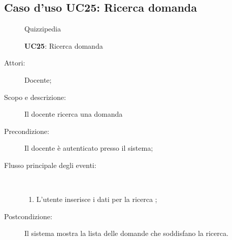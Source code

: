 \subsection{Caso d'uso UC25: Ricerca domanda}
\begin{figure}[H]
	\centering
	\begin{resizedtikzpicture}{\textwidth}
		\begin{umlsystem}[x=0, fill=lightgray!20]{Quizzipedia}
		\end{umlsystem}
	\end{resizedtikzpicture}
	\caption{\textbf{UC25}: Ricerca domanda}
	\label{UC25}
\end{figure}
\begin{description}
	\item[Attori:] Docente;
	\item[Scopo e descrizione:] Il docente ricerca una domanda
	\item[Precondizione:] Il docente è autenticato presso il sistema;
	
	\item[Flusso principale degli eventi:] \ 
	\begin{enumerate}
		\item L'utente inserisce i dati per la ricerca	;
		
	\end{enumerate}
	\item[Postcondizione:] Il sistema mostra la lista delle domande che soddisfano la ricerca.
\end{description}
\hypertarget{UC26}{}
